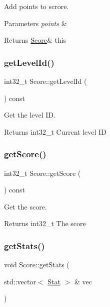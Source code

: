 Add points to scrore. 


\begin{DoxyParams}{Parameters}
{\em points} & \\
\hline
\end{DoxyParams}
\begin{DoxyReturn}{Returns}
\hyperlink{class_score}{Score}\& this 
\end{DoxyReturn}
\mbox{\label{class_score_a0a14f2b51f134e97551f4ac57401a0ce}} 
\subsubsection{\texorpdfstring{get\+Level\+Id()}{getLevelId()}}
{\footnotesize\ttfamily int32\+\_\+t Score\+::get\+Level\+Id (\begin{DoxyParamCaption}{ }\end{DoxyParamCaption}) const}



Get the level ID. 

\begin{DoxyReturn}{Returns}
int32\+\_\+t Current level ID 
\end{DoxyReturn}
\mbox{\label{class_score_a43eef6c9709196a5901a613519dea473}} 
\subsubsection{\texorpdfstring{get\+Score()}{getScore()}}
{\footnotesize\ttfamily int32\+\_\+t Score\+::get\+Score (\begin{DoxyParamCaption}{ }\end{DoxyParamCaption}) const}



Get the score. 

\begin{DoxyReturn}{Returns}
int32\+\_\+t The score 
\end{DoxyReturn}
\mbox{\label{class_score_a7155b0d7742004972bb115a56d734fa6}} 
\subsubsection{\texorpdfstring{get\+Stats()}{getStats()}}
{\footnotesize\ttfamily void Score\+::get\+Stats (\begin{DoxyParamCaption}\item[{std\+::vector$<$ \hyperlink{struct_score_1_1_stat}{Stat} $>$ \&}]{vec }\end{DoxyParamCaption})}




